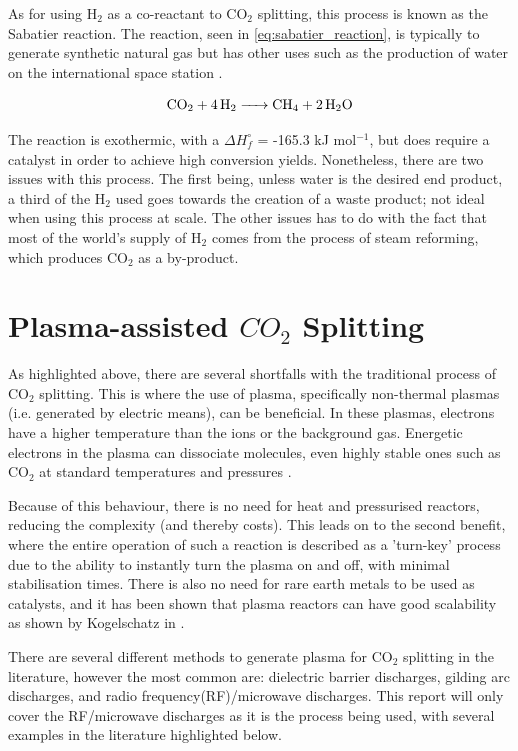 As for using H$_2$ as a co-reactant to CO$_2$ splitting, this process is known as the Sabatier reaction. The reaction, seen in \ref{eq:sabatier_reaction}, is typically to generate synthetic natural gas but has other uses such as the production of water on the international space station \cite{the_sabatier_system}.

\begin{equation}
    \ce{CO_2 + 4H_2 -> CH_4 + 2H_2O}
    \label{eq:sabatier_reaction}
\end{equation}

The reaction is exothermic, with a $\Delta H^\circ_f$ = -165.3 kJ mol$^{-1}$, but does require a catalyst in order to achieve high conversion yields. Nonetheless, there are two issues with this process. The first being, unless water is the desired end product, a third of the H$_2$ used goes towards the creation of a waste product; not ideal when using this process at scale. The other issues has to do with the fact that most of the world's supply of H$_2$ comes from the process of steam reforming, which produces CO$_2$ as a by-product. 

\section{Plasma-assisted $CO_2$ Splitting}

As highlighted above, there are several shortfalls with the traditional process of CO$_2$ splitting. This is where the use of plasma, specifically non-thermal plasmas (i.e. generated by electric means), can be beneficial. In these plasmas,  electrons have a higher temperature than the ions or the background gas. Energetic electrons in the plasma can dissociate molecules, even highly stable ones such as CO$_2$ at standard temperatures and pressures \cite{Snoeckx2017}. 

Because of this behaviour, there is no need for heat and pressurised reactors, reducing the complexity (and thereby costs). This leads on to the second benefit, where the entire operation of such a reaction is described as a 'turn-key' process due to the ability to instantly turn the plasma on and off, with minimal stabilisation times. There is also no need for rare earth metals to be used as catalysts, and it has been shown that plasma reactors can have good scalability as shown by Kogelschatz in \cite{kogelschatz_2003}.  

There are several different methods to generate plasma for CO$_2$ splitting in the literature, however the most common are: dielectric barrier discharges, gilding arc discharges, and radio frequency(RF)/microwave discharges. This report will only cover the RF/microwave discharges as it is the process being used, with several examples in the literature highlighted below.

